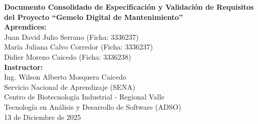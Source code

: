 \documentclass[12pt, a4paper]{report}
\begin{document}
\begin{titlepage}
    \begin{center}
        \vspace*{2cm}
        {\Huge \bfseries Documento Consolidado de Especificación y Validación de Requisitos del Proyecto ``Gemelo Digital de Mantenimiento''}\\[2cm]
        
        {\large \bfseries Aprendices:}\\[0.5cm]
        \large{Juan David Julio Serrano (Ficha: 3336237)}\\[0.2cm]
        \large{María Juliana Calvo Corredor (Ficha: 3336237)}\\[0.2cm]
        \large{Didier Moreno Caicedo (Ficha: 3336238)}\\[1.0cm]
        
        {\large \bfseries Instructor:}\\[0.5cm]
        \large{Ing. Wilson Alberto Mosquera Caicedo}\\[1.5cm]
        
        \vspace{2cm}
        \large{Servicio Nacional de Aprendizaje (SENA)}\\[0.3cm]
        \large{Centro de Biotecnología Industrial - Regional Valle}\\[0.3cm]
        \large{Tecnología en Análisis y Desarrollo de Software (ADSO)}\\[1.0cm]
        \large{13 de Diciembre de 2025}
    \end{center}
\end{titlepage}

\clearpage
{}
\tableofcontents
\clearpage







\end{document}
